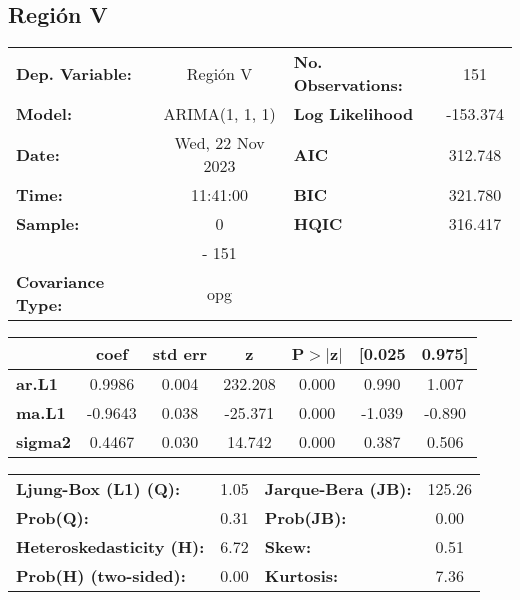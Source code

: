\documentclass{article}%
\begin{document}
\subsection*{Región V}%
\begin{center}
\begin{tabular}{lclc}
\toprule
\textbf{Dep. Variable:}          &     Región V     & \textbf{  No. Observations:  } &    151      \\
\textbf{Model:}                  &  ARIMA(1, 1, 1)  & \textbf{  Log Likelihood     } &  -153.374   \\
\textbf{Date:}                   & Wed, 22 Nov 2023 & \textbf{  AIC                } &  312.748    \\
\textbf{Time:}                   &     11:41:00     & \textbf{  BIC                } &  321.780    \\
\textbf{Sample:}                 &        0         & \textbf{  HQIC               } &  316.417    \\
\textbf{}                        &       - 151      & \textbf{                     } &             \\
\textbf{Covariance Type:}        &       opg        & \textbf{                     } &             \\
\bottomrule
\end{tabular}
\begin{tabular}{lcccccc}
                & \textbf{coef} & \textbf{std err} & \textbf{z} & \textbf{P$> |$z$|$} & \textbf{[0.025} & \textbf{0.975]}  \\
\midrule
\textbf{ar.L1}  &       0.9986  &        0.004     &   232.208  &         0.000        &        0.990    &        1.007     \\
\textbf{ma.L1}  &      -0.9643  &        0.038     &   -25.371  &         0.000        &       -1.039    &       -0.890     \\
\textbf{sigma2} &       0.4467  &        0.030     &    14.742  &         0.000        &        0.387    &        0.506     \\
\bottomrule
\end{tabular}
\begin{tabular}{lclc}
\textbf{Ljung-Box (L1) (Q):}     & 1.05 & \textbf{  Jarque-Bera (JB):  } & 125.26  \\
\textbf{Prob(Q):}                & 0.31 & \textbf{  Prob(JB):          } &  0.00   \\
\textbf{Heteroskedasticity (H):} & 6.72 & \textbf{  Skew:              } &  0.51   \\
\textbf{Prob(H) (two-sided):}    & 0.00 & \textbf{  Kurtosis:          } &  7.36   \\
\bottomrule
\end{tabular}
\end{center}
\end{document}
